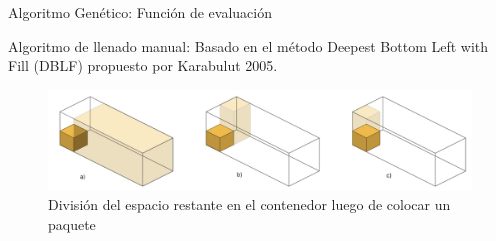 \documentclass{beamer}
\begin{document}
\begin{frame}{Algoritmo Genético: Función de evaluación}
    \begin{exampleblock}{Algoritmo de llenado manual:}
        Basado en el método Deepest Bottom Left with Fill (DBLF) propuesto por Karabulut 2005.
        \begin{figure}
            \centering
            \includegraphics[width=1\textwidth]{pic/dblf.png}
            \caption*{División del espacio restante en el contenedor luego de colocar un paquete}
            \label{fig:dblf}
        \end{figure}
    \end{exampleblock}
\end{frame}
\end{document}
